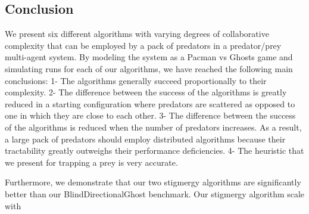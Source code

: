 \documentclass[11pt]{article}
\begin{document}
\begin{multicols}{2}

\section{Conclusion}
We present six different algorithms with varying degrees of collaborative complexity that can be employed by a pack of predators in a predator/prey multi-agent system. By modeling the system as a Pacman vs Ghosts game and simulating runs for each of our algorithms, we have reached the following main conclusions: 1- The algorithms generally succeed proportionally to their complexity. 2- The difference between the success of the algorithms is greatly reduced in a starting configuration where predators are scattered as opposed to one in which they are close to each other. 3- The difference between the success of the algorithms is reduced when the number of predators increases. As a result, a large pack of predators should employ distributed algorithms because their tractability greatly outweighs their performance deficiencies. 4- The heuristic that we present for trapping a prey is very accurate.

Furthermore, we demonstrate that our two stigmergy algorithms are significantly better than our BlindDirectionalGhost benchmark.  Our stigmergy algorithm scale with 


\end{multicols}
\end{document}
